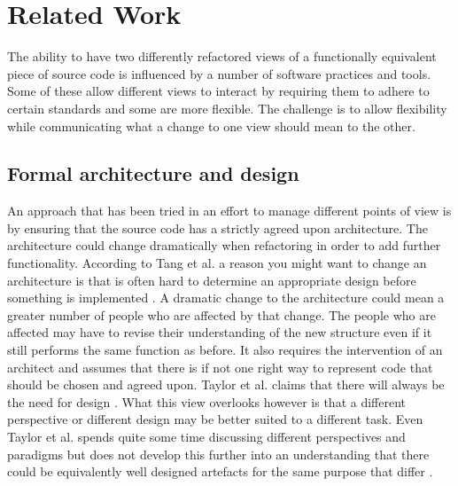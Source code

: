 \documentclass[12pt]{CRPITStyle}
\renewcommand{\cite}{\citep}
\begin{document}
\section{Related Work}
The ability to have two differently refactored views of a functionally equivalent piece of source code is influenced by a number of software practices and tools. Some of these allow different views to interact by requiring them to adhere to certain standards and some are more flexible. The challenge is to allow flexibility while communicating what a change to one view should mean to the other. 

\subsection{Formal architecture and design}
An approach that has been tried in an effort to manage different points of view is by ensuring that the source code has a strictly agreed upon architecture.  The architecture could change dramatically when refactoring in order to add further functionality. According to Tang et al. a reason you might want to change an architecture is that is often hard to determine an appropriate design before something is implemented \cite{Tang2009}. A dramatic change to the architecture could mean a greater number of people who are affected by that change.  The people who are affected may have to revise their understanding of the new structure even if it still performs the same function as before.   It also requires the intervention of an architect and assumes that there is if not one right way to represent code that should be chosen and agreed upon. Taylor et al. claims that there will always be the need for design \cite{Taylor2007}. What this view overlooks however is that a different perspective or different design may be better suited to a different task. Even Taylor et al. spends quite some time discussing different perspectives and paradigms but does not develop this further into an understanding that there could be equivalently well designed artefacts for the same purpose that differ \cite{Taylor2007}.
\end{document}
